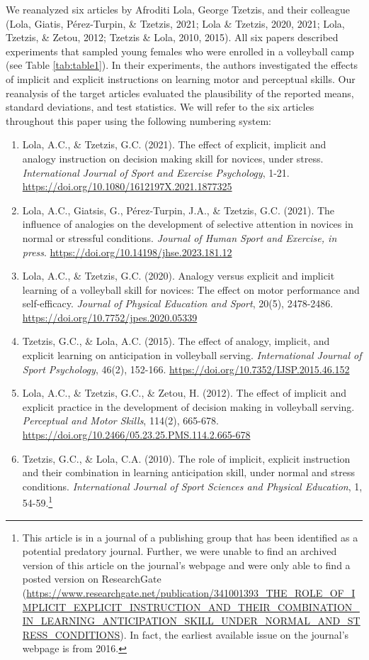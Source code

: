 \documentclass[
  english,
  man, donotrepeattitle,floatsintext]{apa7}
\begin{document}
We reanalyzed six articles by Afroditi Lola, George Tzetzis, and their colleague (Lola, Giatis, Pérez-Turpin, \& Tzetzis, 2021; Lola \& Tzetzis, 2020, 2021; Lola, Tzetzis, \& Zetou, 2012; Tzetzis \& Lola, 2010, 2015). All six papers described experiments that sampled young females who were enrolled in a volleyball camp (see Table \ref{tab:table1}). In their experiments, the authors investigated the effects of implicit and explicit instructions on learning motor and perceptual skills. Our reanalysis of the target articles evaluated the plausibility of the reported means, standard deviations, and test statistics. We will refer to the six articles throughout this paper using the following numbering system:

\begin{enumerate}
\def\labelenumi{\arabic{enumi}.}
\item
  Lola, A.C., \& Tzetzis, G.C. (2021). The effect of explicit, implicit and analogy instruction on decision making skill for novices, under stress. \emph{International Journal of Sport and Exercise Psychology}, 1-21. \url{https://doi.org/10.1080/1612197X.2021.1877325}
\item
  Lola, A.C., Giatsis, G., Pérez-Turpin, J.A., \& Tzetzis, G.C. (2021). The influence of analogies on the development of selective attention in novices in normal or stressful conditions. \emph{Journal of Human Sport and Exercise, in press}. \url{https://doi.org/10.14198/jhse.2023.181.12}
\item
  Lola, A.C., \& Tzetzis, G.C. (2020). Analogy versus explicit and implicit learning of a volleyball skill for novices: The effect on motor performance and self-efficacy. \emph{Journal of Physical Education and Sport}, 20(5), 2478-2486. \url{https://doi.org/10.7752/jpes.2020.05339}
\item
  Tzetzis, G.C., \& Lola, A.C. (2015). The effect of analogy, implicit, and explicit learning on anticipation in volleyball serving. \emph{International Journal of Sport Psychology}, 46(2), 152-166. \url{https://doi.org/10.7352/IJSP.2015.46.152}
\item
  Lola, A.C., \& Tzetzis, G.C., \& Zetou, H. (2012). The effect of implicit and explicit practice in the development of decision making in volleyball serving. \emph{Perceptual and Motor Skills}, 114(2), 665-678. \url{https://doi.org/10.2466/05.23.25.PMS.114.2.665-678}
\item
  Tzetzis, G.C., \& Lola, C.A. (2010). The role of implicit, explicit instruction and their combination in learning anticipation skill, under normal and stress conditions. \emph{International Journal of Sport Sciences and Physical Education}, 1, 54-59.\footnote{This article is in a journal of a publishing group that has been identified as a potential predatory journal. Further, we were unable to find an archived version of this article on the journal's webpage and were only able to find a posted version on ResearchGate (\url{https://www.researchgate.net/publication/341001393_THE_ROLE_OF_IMPLICIT_EXPLICIT_INSTRUCTION_AND_THEIR_COMBINATION_IN_LEARNING_ANTICIPATION_SKILL_UNDER_NORMAL_AND_STRESS_CONDITIONS}). In fact, the earliest available issue on the journal's webpage is from 2016.}
\end{enumerate}
\end{document}
